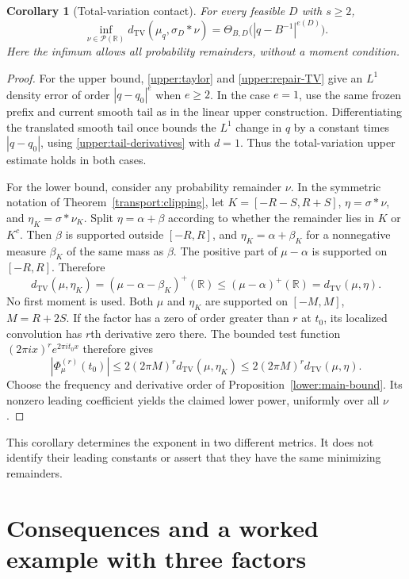 \documentclass[11pt,letterpaper]{article}
\newtheorem{corollary}[theorem]{Corollary}
\theoremstyle{definition}
\theoremstyle{remark}
\newcommand{\R}{\mathbb R}
\begin{document}
\begin{corollary}[Total-variation contact]\label{cor:tv}
For every feasible $D$ with $s\ge2$,
\[
 \inf_{\nu\in\mathcal P(\R)}
 d_{\mathrm{TV}}(\mu_q,\sigma_D*\nu)
 =\Theta_{B,D}\bigl(|q-B^{-1}|^{e(D)}\bigr).
\]
Here the infimum allows all probability remainders, without a moment condition.
\end{corollary}
\begin{proof}
For the upper bound, \eqref{upper:taylor} and \eqref{upper:repair-TV} give an $L^1$ density error of order $|q-q_0|^e$ when $e\ge2$. In the case $e=1$, use the same frozen prefix and current smooth tail as in the linear upper construction. Differentiating the translated smooth tail once bounds the $L^1$ change in $q$ by a constant times $|q-q_0|$, using \eqref{upper:tail-derivatives} with $d=1$. Thus the total-variation upper estimate holds in both cases.

For the lower bound, consider any probability remainder $\nu$. In the symmetric notation of Theorem~\ref{transport:clipping}, let $K=[-R-S,R+S]$, $\eta=\sigma*\nu$, and $\eta_K=\sigma*\nu_K$. Split $\eta=\alpha+\beta$ according to whether the remainder lies in $K$ or $K^c$. Then $\beta$ is supported outside $[-R,R]$, and $\eta_K=\alpha+\beta_K$ for a nonnegative measure $\beta_K$ of the same mass as $\beta$. The positive part of $\mu-\alpha$ is supported on $[-R,R]$. Therefore
\[
 d_{\mathrm{TV}}(\mu,\eta_K)
 = (\mu-\alpha-\beta_K)^+(\R)
 \le (\mu-\alpha)^+(\R)
 = d_{\mathrm{TV}}(\mu,\eta).
\]
No first moment is used. Both $\mu$ and $\eta_K$ are supported on $[-M,M]$, $M=R+2S$. If the factor has a zero of order greater than $r$ at $t_0$, its localized convolution has $r$th derivative zero there. The bounded test function $(2\pi i x)^re^{2\pi it_0x}$ therefore gives
\[
 |\Phi_\mu^{(r)}(t_0)|
 \le2(2\pi M)^r d_{\mathrm{TV}}(\mu,\eta_K)
 \le2(2\pi M)^r d_{\mathrm{TV}}(\mu,\eta).
\]
Choose the frequency and derivative order of Proposition~\ref{lower:main-bound}. Its nonzero leading coefficient yields the claimed lower power, uniformly over all $\nu$.
\end{proof}
This corollary determines the exponent in two different metrics. It does not identify their leading constants or assert that they have the same minimizing remainders.


\section{Consequences and a worked example with three factors}\label{sec:examples}
\end{document}
